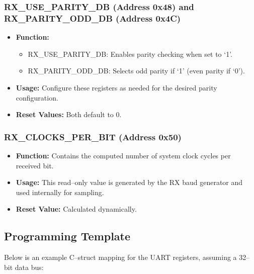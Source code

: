 \subsubsection{RX\_USE\_PARITY\_DB (Address 0x48) and RX\_PARITY\_ODD\_DB (Address 0x4C)}
\begin{itemize}[noitemsep]
    \item \textbf{Function:} 
    \begin{itemize}
        \item RX\_USE\_PARITY\_DB: Enables parity checking when set to ‘1’.
        \item RX\_PARITY\_ODD\_DB: Selects odd parity if ‘1’ (even parity if ‘0’).
    \end{itemize}
    \item \textbf{Usage:} Configure these registers as needed for the desired parity configuration.
    \item \textbf{Reset Values:} Both default to 0.
\end{itemize}

\subsubsection{RX\_CLOCKS\_PER\_BIT (Address 0x50)}
\begin{itemize}[noitemsep]
    \item \textbf{Function:} Contains the computed number of system clock cycles per received bit.
    \item \textbf{Usage:} This read–only value is generated by the RX baud generator and used internally for sampling.
    \item \textbf{Reset Value:} Calculated dynamically.
\end{itemize}

\subsection{Programming Template}

Below is an example C–struct mapping for the UART registers, assuming a 32–bit data bus:

